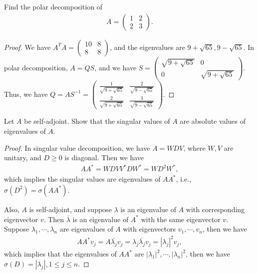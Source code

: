 \documentclass[12pt,leqno]{amsart}
\begin{document}
 Find the polar decomposition of 
\begin{align*}
    A = \begin{pmatrix}
    1 & 2 \\
    2 & 3
    \end{pmatrix}.
\end{align*}
\begin{proof}
We have $A^T A = \begin{pmatrix}
    10 & 8 \\
    8 & 8
    \end{pmatrix}$, and the eigenvalues are $9+\sqrt{65}, 9-\sqrt{65}$. In polar decomposition, $A = QS$, and we have $S = \begin{pmatrix}
    \sqrt{9+\sqrt{65}} & 0 \\
    0 & \sqrt{9+\sqrt{65}}
    \end{pmatrix}$. Thus, we have $Q = AS^{-1} = \begin{pmatrix}
    \frac{1}{\sqrt{9+\sqrt{65}}} & \frac{2}{\sqrt{9-\sqrt{65}}} \\
    \frac{2}{\sqrt{9+\sqrt{65}}} & \frac{3}{\sqrt{9-\sqrt{65}}}
    \end{pmatrix}$.
\end{proof}

\medskip

 Let $A$ be self-adjoint. Show that the singular values of $A$ are absolute values of eigenvalues of $A$.
\begin{proof}
In singular value decomposition, we have $A = WDV$, where $W,V$ are unitary, and $D\geq 0$ is diagonal. Then we have
\begin{align*}
    AA^* = W D V V^* D W^* = W D^2 W^*,
\end{align*}
which implies the singular values are eigenvalues of $AA^*$, i.e., $\sigma\left(D^2\right) = \sigma(AA^*)$. 

Also, $A$ is self-adjoint, and suppose $\lambda$ is an eigenvalue of $A$ with corresponding eigenvector $v$. Then $\overline{\lambda}$ is an eigenvalue of $A^*$ with the same eigenvector $v$. Suppose $\lambda_1,\cdots,\lambda_n$ are eigenvalues of $A$ with eigenvectors $v_1,\cdots,v_n$, then we have
\begin{align*}
    AA^*v_j = A \overline{\lambda_j}v_j = \lambda_j \overline{\lambda_j}v_j = |\lambda_j|^2 v_j,
\end{align*}
which implies that the eigenvalues of $AA^*$ are $|\lambda_1|^2,\cdots,|\lambda_n|^2$, then we have $\sigma(D) = |\lambda_j|, 1\leq j \leq n$.
\end{proof}
\end{document}
